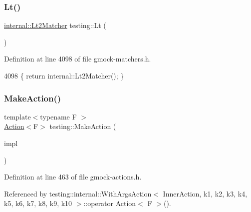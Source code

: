 \subsubsection{\texorpdfstring{Lt()}{Lt()}\hspace{0.1cm}{\footnotesize\ttfamily [2/2]}}
{\footnotesize\ttfamily \hyperlink{classtesting_1_1internal_1_1Lt2Matcher}{internal\+::\+Lt2\+Matcher} testing\+::\+Lt (\begin{DoxyParamCaption}{ }\end{DoxyParamCaption})\hspace{0.3cm}{\ttfamily [inline]}}



Definition at line 4098 of file gmock-\/matchers.\+h.


\begin{DoxyCode}
4098 \{ \textcolor{keywordflow}{return} internal::Lt2Matcher(); \}
\end{DoxyCode}
\mbox{\label{namespacetesting_ae6b9960db2b2685e043ce5215291f5b8}} 
\subsubsection{\texorpdfstring{Make\+Action()}{MakeAction()}}
{\footnotesize\ttfamily template$<$typename F $>$ \\
\hyperlink{classtesting_1_1Action}{Action}$<$F$>$ testing\+::\+Make\+Action (\begin{DoxyParamCaption}\item[{\hyperlink{classtesting_1_1ActionInterface}{Action\+Interface}$<$ F $>$ $\ast$}]{impl }\end{DoxyParamCaption})}



Definition at line 463 of file gmock-\/actions.\+h.



Referenced by testing\+::internal\+::\+With\+Args\+Action$<$ Inner\+Action, k1, k2, k3, k4, k5, k6, k7, k8, k9, k10 $>$\+::operator Action$<$ F $>$().


